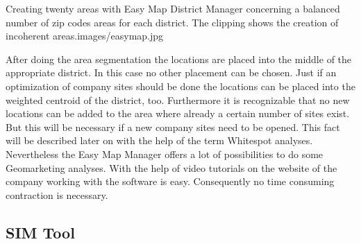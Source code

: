 \begin{figureOwn}{Creating twenty areas with Easy Map District Manager concerning a balanced number of zip codes areas for each district. The clipping shows the creation of incoherent areas.}{images/easymap.jpg}\end{figureOwn}


After doing the area segmentation the locations are placed into the middle of the appropriate district. In this case no other placement can be chosen. Just if an optimization of company sites should be done the locations can be placed into the weighted centroid of the district, too. Furthermore it is recognizable that no new locations can be added to the area where already a certain number of sites exist. But this will be necessary if a new company sites need to be opened. This fact will be described later on with the help of the term Whitespot analyses. \\
Nevertheless the Easy Map Manager offers a lot of possibilities to do some Geomarketing analyses. With the help of video tutorials on the website of the company working with the software is easy. Consequently no time consuming contraction is necessary. 

\subsection{SIM Tool}
